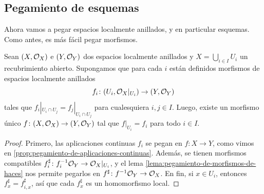 \documentclass{article}
\numberwithin{equation}{section}
\theoremstyle{definition}
\begin{document}
\subsection{Pegamiento de esquemas}
\label{sec:pegamiento}

Ahora vamos a pegar espacios localmente anillados, y en particular
esquemas. Como antes, es más fácil pegar morfismos.

\begin{proposicion}
  Sean $(X, \mathcal{O}_X)$ e $(Y, \mathcal{O}_Y)$ dos espacios localmente anillados
  y $X = \bigcup_{i\in I} U_i$ un recubrimiento abierto. Supongamos que para
  cada $i$ están definidos morfismos de espacios localmente anillados
  $$f_i\colon (U_i, \mathcal{O}_X|_{U_i}) \to (Y, \mathcal{O}_Y)$$
  tales que $f_i|_{U_i\cap U_j} = f_j|_{U_i\cap U_j}$ para cualesquiera
  $i,j \in I$. Luego, existe un morfismo único $f\colon (X, \mathcal{O}_X)\to (Y, \mathcal{O}_Y)$
  tal que $f|_{U_i} = f_i$ para todo $i\in I$.

  \begin{proof}
    Primero, las aplicaciones continuas $f_i$ se pegan en $f\colon X\to Y$,
    como vimos en \ref{prop:pegamiento-de-aplicaciones-continuas}.
    Además, se tienen morfismos compatibles
    $f_i^\sharp\colon f_i^{-1} \mathcal{O}_Y \to \mathcal{O}_X|_{U_i}$, y el lema
    \ref{lema:pegamiento-de-morfismos-de-haces} nos permite pegarlos
    en $f^\sharp\colon f^{-1} \mathcal{O}_Y \to \mathcal{O}_X$. En fin, si $x \in U_i$, entonces
    $f^\sharp_x = f^\sharp_{i,x}$, así que cada $f^\sharp_x$ es un homomorfismo
    local.
  \end{proof}
\end{proposicion}

\end{document}
